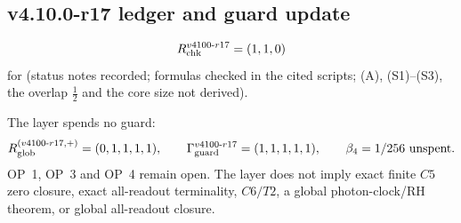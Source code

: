 \subsection*{v4.10.0-r17 ledger and guard update}
\label{subsec:v4100-r17-ledger-guard}

\[
R_{\rm chk}^{v4100\text{-}r17}=(1,1,0)
\]
for (status notes recorded; formulas checked in the cited scripts; (A), (S1)--(S3), the overlap \(\tfrac12\) and the core size not
derived).

The layer spends no guard:
\[
R_{\rm glob}^{(v4100\text{-}r17,+)}=(0,1,1,1,1),
\qquad
\Gamma_{\rm guard}^{v4100\text{-}r17}=(1,1,1,1,1),
\qquad
\beta_4=1/256\ \text{unspent}.
\]
OP~1, OP~3 and OP~4 remain open.  The layer does not imply exact finite \(C5\) zero closure, exact all-readout terminality,
\(C6/T2\), a global photon-clock/RH theorem, or global all-readout closure.
